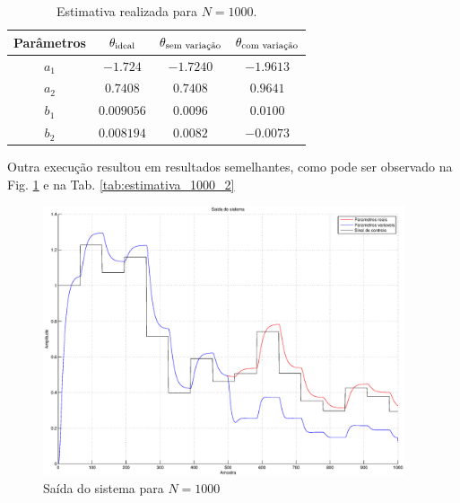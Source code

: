 \begin{table}
\centering
    \caption{Estimativa realizada para $N = 1000$.}
    \label{tab:estimativa_1000}
    \vspace{0.25cm}
    \begin{tabular}{|c|c|c|c|}
        \hline
        Parâmetros & 
        $\mathbf{\theta}_{\text{ideal}}$&
        $\mathbf{\theta}_{\text{sem variação}}$&
        $\mathbf{\theta}_{\text{com variação}}$\\
        \hline
        \hline
        $a_1$ & $-1.724$   & $-1.7240$ & $-1.9613$ \\
        \hline
        $a_2$ & $0.7408$   & $0.7408$  & $0.9641$ \\
        \hline
        $b_1$ & $0.009056$ & $0.0096$  & $0.0100$ \\
        \hline
        $b_2$ & $0.008194$ & $0.0082$  & $-0.0073$ \\
        \hline
    \end{tabular}
\end{table}

Outra execução resultou em resultados semelhantes, como pode ser observado na
Fig. \ref{fig:saida_sist_1000_2} e na Tab. \ref{tab:estimativa_1000_2}

\begin{figure}[htb]
\centering
    \includegraphics[width=0.95\textwidth]{imgs/questao2/saida_1000_2}
    \caption{Saída do sistema para $N = 1000$}
    \label{fig:saida_sist_1000_2}
\end{figure}

